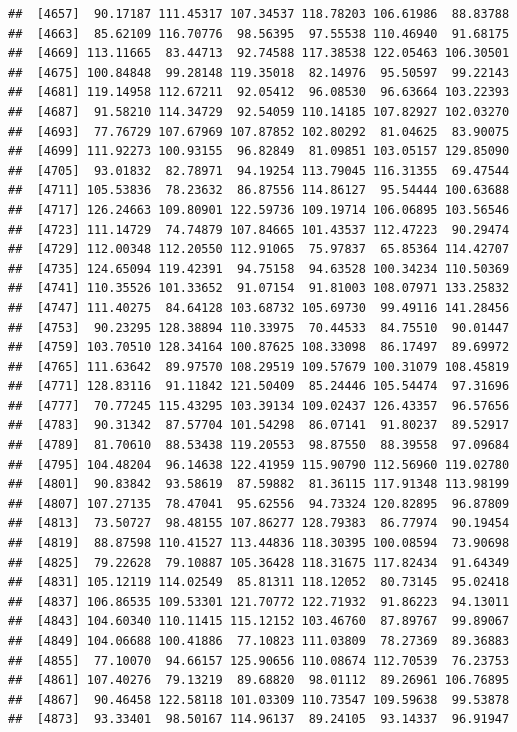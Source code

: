\documentclass[
]{article}
\begin{document}
\begin{verbatim}
##  [4657]  90.17187 111.45317 107.34537 118.78203 106.61986  88.83788
##  [4663]  85.62109 116.70776  98.56395  97.55538 110.46940  91.68175
##  [4669] 113.11665  83.44713  92.74588 117.38538 122.05463 106.30501
##  [4675] 100.84848  99.28148 119.35018  82.14976  95.50597  99.22143
##  [4681] 119.14958 112.67211  92.05412  96.08530  96.63664 103.22393
##  [4687]  91.58210 114.34729  92.54059 110.14185 107.82927 102.03270
##  [4693]  77.76729 107.67969 107.87852 102.80292  81.04625  83.90075
##  [4699] 111.92273 100.93155  96.82849  81.09851 103.05157 129.85090
##  [4705]  93.01832  82.78971  94.19254 113.79045 116.31355  69.47544
##  [4711] 105.53836  78.23632  86.87556 114.86127  95.54444 100.63688
##  [4717] 126.24663 109.80901 122.59736 109.19714 106.06895 103.56546
##  [4723] 111.14729  74.74879 107.84665 101.43537 112.47223  90.29474
##  [4729] 112.00348 112.20550 112.91065  75.97837  65.85364 114.42707
##  [4735] 124.65094 119.42391  94.75158  94.63528 100.34234 110.50369
##  [4741] 110.35526 101.33652  91.07154  91.81003 108.07971 133.25832
##  [4747] 111.40275  84.64128 103.68732 105.69730  99.49116 141.28456
##  [4753]  90.23295 128.38894 110.33975  70.44533  84.75510  90.01447
##  [4759] 103.70510 128.34164 100.87625 108.33098  86.17497  89.69972
##  [4765] 111.63642  89.97570 108.29519 109.57679 100.31079 108.45819
##  [4771] 128.83116  91.11842 121.50409  85.24446 105.54474  97.31696
##  [4777]  70.77245 115.43295 103.39134 109.02437 126.43357  96.57656
##  [4783]  90.31342  87.57704 101.54298  86.07141  91.80237  89.52917
##  [4789]  81.70610  88.53438 119.20553  98.87550  88.39558  97.09684
##  [4795] 104.48204  96.14638 122.41959 115.90790 112.56960 119.02780
##  [4801]  90.83842  93.58619  87.59882  81.36115 117.91348 113.98199
##  [4807] 107.27135  78.47041  95.62556  94.73324 120.82895  96.87809
##  [4813]  73.50727  98.48155 107.86277 128.79383  86.77974  90.19454
##  [4819]  88.87598 110.41527 113.44836 118.30395 100.08594  73.90698
##  [4825]  79.22628  79.10887 105.36428 118.31675 117.82434  91.64349
##  [4831] 105.12119 114.02549  85.81311 118.12052  80.73145  95.02418
##  [4837] 106.86535 109.53301 121.70772 122.71932  91.86223  94.13011
##  [4843] 104.60340 110.11415 115.12152 103.46760  87.89767  99.89067
##  [4849] 104.06688 100.41886  77.10823 111.03809  78.27369  89.36883
##  [4855]  77.10070  94.66157 125.90656 110.08674 112.70539  76.23753
##  [4861] 107.40276  79.13219  89.68820  98.01112  89.26961 106.76895
##  [4867]  90.46458 122.58118 101.03309 110.73547 109.59638  99.53878
##  [4873]  93.33401  98.50167 114.96137  89.24105  93.14337  96.91947

\end{verbatim}
\end{document}

